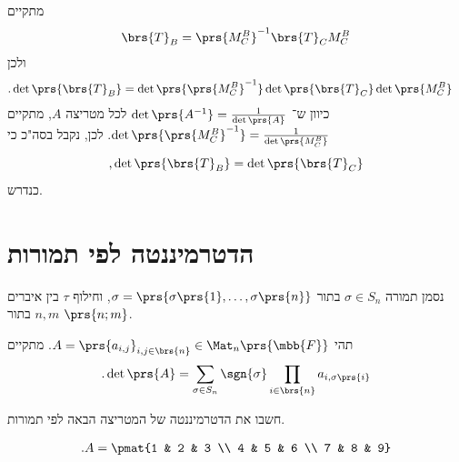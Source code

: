 \documentclass[a4paper,10pt,twoside,openany]{book}
\begin{document}
\begin{solution}
מתקיים
\begin{align*}
\brs{T}_B = \prs{M^B_C}^{-1} \brs{T}_C M^B_C
\end{align*}
ולכן
\begin{align*}
\text{.} \det\prs{\brs{T}_B} &= \det\prs{\prs{M^B_C}^{-1}} \det\prs{\brs{T}_C} \det\prs{M^B_C}
\end{align*}
כיוון ש־%
$\det\prs{A^{-1}} = \frac{1}{\det\prs{A}}$
 לכל מטריצה
 $A$,
 מתקיים
 $\det\prs{\prs{M^B_C}^{-1}} = \frac{1}{\det\prs{M^B_C}}$.
 לכן, נקבל בסה"כ כי
 \[\text{,} \det\prs{\brs{T}_B} = \det\prs{\brs{T}_C}\]
 כנדרש.
\end{solution}

\section{הדטרמיננטה לפי תמורות}

\begin{notation}
נסמן תמורה
$\sigma \in S_n$
בתור
$\sigma = \prs{\sigma\prs{1}, \ldots, \sigma\prs{n}}$,
וחילוף
$\tau$
בין איברים
$n,m$
בתור
$\prs{n;m}$.
\end{notation}

\begin{proposition}
תהי
$A = \prs{a_{i,j}}_{i,j \in \brs{n}} \in \Mat_n\prs{\mbb{F}}$.
מתקיים
\[\text{.} \det\prs{A} = \sum_{\sigma \in S_n} \sgn{\sigma} \prod_{i \in \brs{n}} a_{i,\sigma\prs{i}}\]
\end{proposition}

\begin{exercisechap}
חשבו את הדטרמיננטה של המטריצה הבאה לפי תמורות.

\begin{align*}
\text{.} A = \pmat{1 & 2 & 3 \\ 4 & 5 & 6 \\ 7 & 8 & 9}
\end{align*}
\end{exercisechap}
\end{document}

